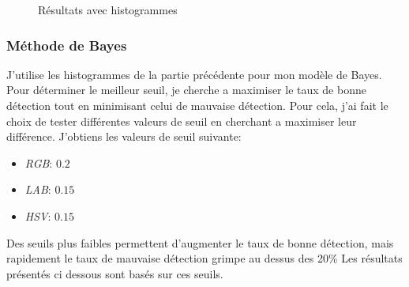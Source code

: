 \documentclass{article}
\begin{document}
\begin{figure}[h!]
  \centering

  \caption{Résultats avec histogrammes}
\end{figure}
\subsubsection{Méthode de Bayes}
J'utilise les histogrammes de la partie précédente pour mon modèle de Bayes. Pour déterminer le meilleur seuil, je cherche a maximiser le taux de bonne détection tout en minimisant celui de mauvaise détection. Pour cela, j'ai fait le choix de tester différentes valeurs de seuil en cherchant a maximiser leur différence. J'obtiens les valeurs de seuil suivante:
\begin{itemize}
    \item \textit{RGB}: $0.2$
    \item \textit{LAB}: $0.15$
    \item \textit{HSV}: $0.15$
\end{itemize}
Des seuils plus faibles permettent d'augmenter le taux de bonne détection, mais rapidement le taux de mauvaise détection grimpe au dessus des 20\%
Les résultats présentés ci dessous sont basés sur ces seuils.
\end{document}
